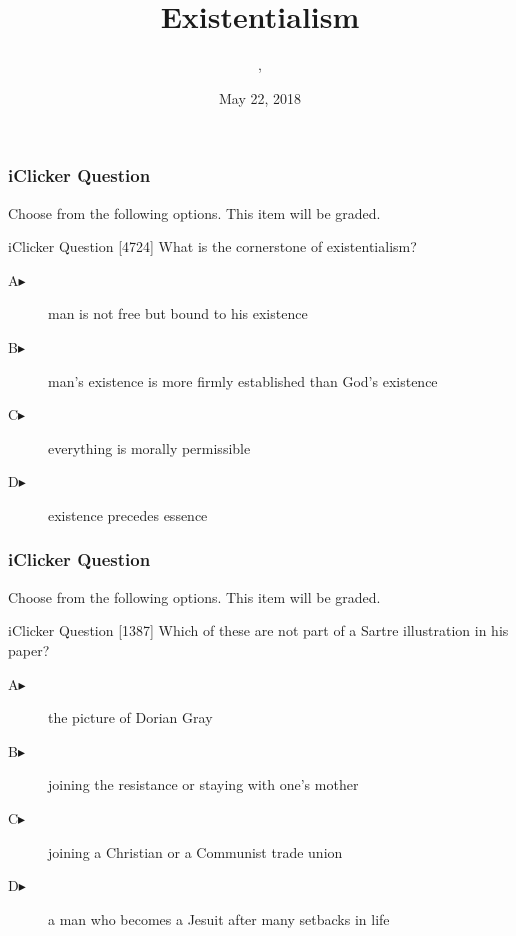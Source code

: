 \documentclass[xcolor=dvipsnames]{beamer}
\title{Existentialism}
\subtitle{{\CourseNumber}, {\CourseInst}}
\author{\CourseName}
\date{May 22, 2018}
\begin{document}
\begin{frame}
  \titlepage
\end{frame}

\begin{frame}
  \frametitle{iClicker Question}
Choose from the following options. This item will be graded.
\begin{block}{iClicker Question}
[4724] What is the cornerstone of existentialism?
\end{block}
\begin{description}
\item[A\hspace{.2in}$\blacktriangleright$] man is not free but bound to his existence
\item[B\hspace{.2in}$\blacktriangleright$] man's existence is more firmly established than God's existence
\item[C\hspace{.2in}$\blacktriangleright$] everything is morally permissible
\item[D\hspace{.2in}$\blacktriangleright$] existence precedes essence
\end{description}
\end{frame}

\begin{frame}
  \frametitle{iClicker Question}
Choose from the following options. This item will be graded.
\begin{block}{iClicker Question}
[1387] Which of these are not part of a Sartre illustration in his paper?
\end{block}
\begin{description}
\item[A\hspace{.2in}$\blacktriangleright$] the picture of Dorian Gray
\item[B\hspace{.2in}$\blacktriangleright$] joining the resistance or staying with one's mother
\item[C\hspace{.2in}$\blacktriangleright$] joining a Christian or a Communist trade union
\item[D\hspace{.2in}$\blacktriangleright$] a man who becomes a Jesuit after many setbacks in life
\end{description}
\end{frame}
\end{document}
